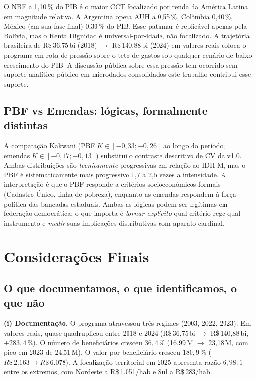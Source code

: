 \documentclass[12pt,a4paper,oneside]{article}
\newcommand{\rs}{R\$\,}
\begin{document}
O NBF a 1,10\,\% do PIB é o maior CCT focalizado por renda da
América Latina em magnitude relativa. A Argentina opera AUH a
0,55\,\%, Colômbia 0,40\,\%, México (em sua fase final) 0,30\,\% do
PIB. Esse patamar é replicável apenas pela Bolívia, mas o Renta
Dignidad é universal-por-idade, não focalizado. A trajetória
brasileira de \rs 36,75\,bi (2018) $\to$ \rs 140,88\,bi (2024) em
valores reais coloca o programa em rota de pressão sobre o teto de
gastos sob qualquer cenário de baixo crescimento do PIB. A
discussão pública sobre essa pressão tem ocorrido sem suporte
analítico público em microdados consolidados \textemdash{} este
trabalho contribui esse suporte.

\subsection{PBF vs Emendas: lógicas, formalmente distintas}

A comparação Kakwani (PBF $K \in [-0,33; -0,26]$ ao longo do
período; emendas $K \in [-0,17; -0,13]$) substitui o contraste
descritivo de CV da v1.0. Ambas distribuições são \textit{tecnicamente}
progressivas em relação ao IDH-M, mas o PBF é
sistematicamente mais progressivo \textemdash{} 1,7 a 2,5 vezes a
intensidade. A interpretação é que o PBF responde a critérios
socioeconômicos formais (Cadastro Único, linha de pobreza),
enquanto as emendas respondem à força política das bancadas
estaduais. Ambas as lógicas podem ser legítimas em federação
democrática; o que importa é \textit{tornar explícito} qual
critério rege qual instrumento e \textit{medir} suas implicações
distributivas com aparato cardinal.

\section{Considerações Finais}\label{sec:conclusao}

\subsection{O que documentamos, o que identificamos, o que não}

\textbf{(i) Documentação.} O programa atravessou três regimes
(2003, 2022, 2023). Em valores
reais, quase quadruplicou entre 2018 e 2024 (\rs 36,75\,bi $\to$
\rs 140,88\,bi, $+283,4\,\%$). O número de beneficiários cresceu
$36,4\,\%$ (16,99\,M $\to$ 23,18\,M, com pico em 2023 de 24,51\,M).
O valor por beneficiário cresceu $180,9\,\%$ ($\rs 2.163 \to
\rs 6.078$). A focalização territorial em 2025 apresenta razão
$6,98:1$ entre os extremos, com Nordeste a \rs 1.051/hab e Sul a
\rs 283/hab.
\end{document}
